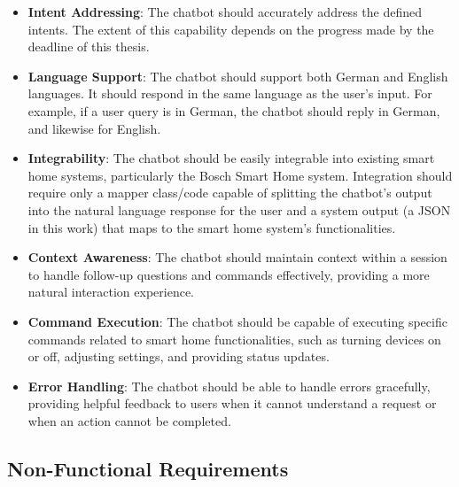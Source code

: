 \begin{itemize}
    \item \textbf{Intent Addressing}: The chatbot should accurately address the defined intents. The extent of this capability depends on the progress made by the deadline of this thesis.
    
    \item \textbf{Language Support}: The chatbot should support both German and English languages. It should respond in the same language as the user's input. For example, if a user query is in German, the chatbot should reply in German, and likewise for English.
    
    \item \textbf{Integrability}: The chatbot should be easily integrable into existing smart home systems, particularly the Bosch Smart Home system. Integration should require only a mapper class/code capable of splitting the chatbot's output into the natural language response for the user and a system output (a JSON in this work) that maps to the smart home system's functionalities.
    
    \item \textbf{Context Awareness}: The chatbot should maintain context within a session to handle follow-up questions and commands effectively, providing a more natural interaction experience.
    
    \item \textbf{Command Execution}: The chatbot should be capable of executing specific commands related to smart home functionalities, such as turning devices on or off, adjusting settings, and providing status updates.
    
    \item \textbf{Error Handling}: The chatbot should be able to handle errors gracefully, providing helpful feedback to users when it cannot understand a request or when an action cannot be completed.
\end{itemize}

\subsection{Non-Functional Requirements}

